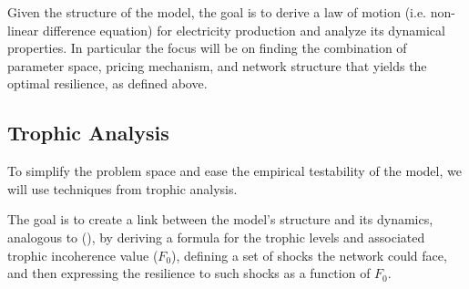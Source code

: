 \documentclass[american]{scrartcl}
\begin{document}
Given the structure of the model, the goal is to derive a law of motion (i.e. non-linear difference equation) for electricity production and analyze its dynamical properties. In particular the focus will be on finding the combination of parameter space, pricing mechanism, and network structure that yields the optimal resilience, as defined above.

\subsection{Trophic Analysis}

To simplify the problem space and ease the empirical testability of the model, we will use techniques from trophic analysis.

The goal is to create a link between the model's structure and its dynamics, analogous to \citeauthor{MacKay2020} (\citeyear[p.~19]{MacKay2020}), by deriving a formula for the trophic levels and associated trophic incoherence value ($F_0$), defining a set of shocks the network could face, and then expressing the resilience to such shocks as a function of $F_0$.
\end{document}
